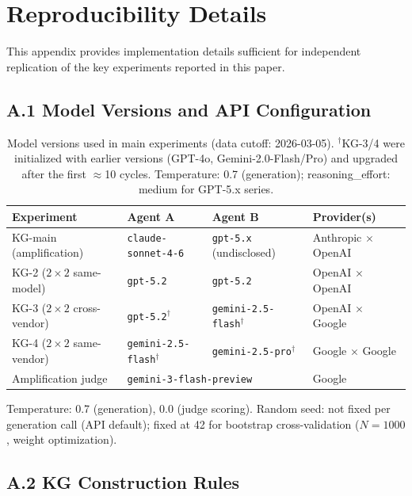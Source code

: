 \documentclass[12pt]{article}
\begin{document}
\section{Reproducibility Details}
\label{sec:reproducibility}

This appendix provides implementation details sufficient for independent replication
of the key experiments reported in this paper.

\subsection*{A.1 Model Versions and API Configuration}

\begin{table}[h!]\centering\small
\begin{tabular}{llll}
\toprule
Experiment & Agent A & Agent B & Provider(s) \\
\midrule
KG-main (amplification) & \texttt{claude-sonnet-4-6} & \texttt{gpt-5.x} (undisclosed) & Anthropic $\times$ OpenAI \\
KG-2 ($2\times2$ same-model) & \texttt{gpt-5.2} & \texttt{gpt-5.2} & OpenAI $\times$ OpenAI \\
KG-3 ($2\times2$ cross-vendor) & \texttt{gpt-5.2}$^{\dagger}$ & \texttt{gemini-2.5-flash}$^{\dagger}$ & OpenAI $\times$ Google \\
KG-4 ($2\times2$ same-vendor) & \texttt{gemini-2.5-flash}$^{\dagger}$ & \texttt{gemini-2.5-pro}$^{\dagger}$ & Google $\times$ Google \\
Amplification judge & \multicolumn{2}{l}{\texttt{gemini-3-flash-preview}} & Google \\
\bottomrule
\end{tabular}
\caption{Model versions used in main experiments (data cutoff: 2026-03-05).
$^{\dagger}$KG-3/4 were initialized with earlier versions (GPT-4o, Gemini-2.0-Flash/Pro)
and upgraded after the first $\approx$10 cycles. Temperature: 0.7 (generation);
reasoning\_effort: medium for GPT-5.x series.}
\end{table}

\noindent Temperature: 0.7 (generation), 0.0 (judge scoring).
Random seed: not fixed per generation call (API default); fixed at 42 for
bootstrap cross-validation ($N=1000$, weight optimization).

\subsection*{A.2 KG Construction Rules}
\end{document}
